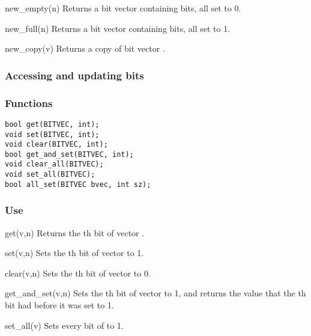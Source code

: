 \begin{defun}{new_empty}{(n)}
Returns a bit vector containing  bits, all set to 0.
\end{defun}

\begin{defun}{new_full}{(n)}
Returns a bit vector containing  bits, all set to 1.
\end{defun}

\begin{defun}{new_copy}{(v)}
Returns a copy of bit vector .
\end{defun}

\subsubsection*{Accessing and updating bits}

\subsubsection*{Functions}
\begin{verbatim}
bool get(BITVEC, int);
void set(BITVEC, int);
void clear(BITVEC, int);
bool get_and_set(BITVEC, int);
void clear_all(BITVEC);
void set_all(BITVEC);
bool all_set(BITVEC bvec, int sz);
\end{verbatim}

\subsubsection*{Use}

\begin{defun}{get}{(v,n)}
Returns the th bit of vector .
\end{defun}

\begin{defun}{set}{(v,n)}
Sets the th bit of vector  to 1.
\end{defun}

\begin{defun}{clear}{(v,n)}
Sets the th bit of vector  to 0.
\end{defun}

\begin{defun}{get_and_set}{(v,n)}
Sets the th bit of vector  to 1, and returns the value
that the th bit had before it was set to 1.
\end{defun}

\begin{defun}{set_all}{(v)}
Sets every bit of  to 1.
\end{defun}

